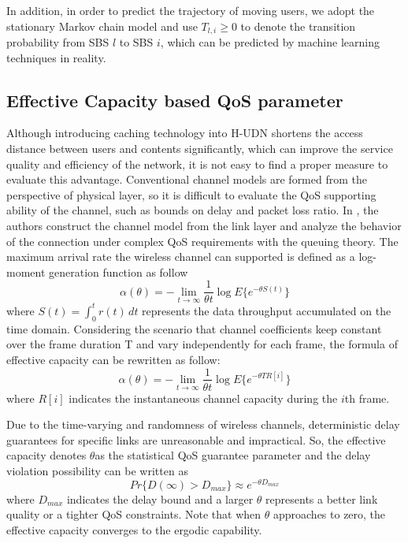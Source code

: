 \documentclass[conference]{IEEEtran}
\begin{document}
In addition, in order to predict the trajectory of moving users, we adopt the stationary Markov chain model and use $T_{l,i}\ge 0$ to denote the transition probability from SBS $l$ to SBS $i$, which can be predicted by machine learning techniques in reality.

\subsection{Effective Capacity based QoS parameter}
Although introducing caching technology into H-UDN shortens the access distance between users and contents significantly, which can improve the service quality and efficiency of the network, it is not easy to find a proper measure to evaluate this advantage. Conventional channel models are formed from the perspective of physical layer, so it is difficult to evaluate the QoS supporting ability of the channel, such as bounds on delay and packet loss ratio. In \cite{1210731}, the authors construct the channel model from the link layer and analyze the behavior of the connection under complex QoS requirements with the queuing theory. The maximum arrival rate the wireless channel can supported is defined as a log-moment generation function as follow
\begin{equation}
\alpha(\theta)=-\lim_{t \to \infty}\frac{1}{\theta t}\log E\{e^{-\theta S(t)}\}
\end{equation}
where $S(t)=\int_{0}^{t} r(t)\, dt$ represents the data throughput accumulated on the time domain. Considering the scenario that channel coefficients keep constant over the frame duration T and vary independently for each frame, the formula of effective capacity can be rewritten as follow:
\begin{equation}
\alpha(\theta)=-\lim_{t \to \infty}\frac{1}{\theta t}\log E\{e^{-\theta TR[i]}\}
\end{equation}
where $R[i]$ indicates the instantaneous channel capacity during the $i$th frame.

Due to the time-varying and randomness of wireless channels, deterministic delay guarantees for specific links are unreasonable and impractical. So, the effective capacity denotes
$\theta$as the statistical QoS guarantee parameter and the delay violation possibility can be written as
\begin{equation}
Pr\{D(\infty)>D_{max}\}\approx e^{-\theta D_{max}}
\end{equation}
where $D_{max}$ indicates the delay bound and a larger $\theta$ represents a better link quality or a tighter QoS constraints. Note that when $\theta$ approaches to zero, the effective capacity converges to the ergodic capability.
\end{document}
